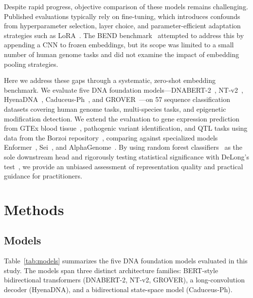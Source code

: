 \documentclass[11pt]{article}
\begin{document}
Despite rapid progress, objective comparison of these models remains challenging.  Published evaluations typically rely on fine-tuning, which introduces confounds from hyperparameter selection, layer choice, and parameter-efficient adaptation strategies such as LoRA~\citep{hu2022lora,houlsby2019parameter}.  The BEND benchmark~\citep{linder2022bend} attempted to address this by appending a CNN to frozen embeddings, but its scope was limited to a small number of human genome tasks and did not examine the impact of embedding pooling strategies.

Here we address these gaps through a systematic, zero-shot embedding benchmark.  We evaluate five DNA foundation models---DNABERT-2~\citep{zhou2023dnabert2}, NT-v2~\citep{dalla2023nucleotide}, HyenaDNA~\citep{nguyen2024hyenadna}, Caduceus-Ph~\citep{schiff2024caduceus}, and GROVER~\citep{sanabria2024grover}---on 57 sequence classification datasets covering human genome tasks, multi-species tasks, and epigenetic modification detection.  We extend the evaluation to gene expression prediction from GTEx blood tissue~\citep{gtex2020gtex,lonsdale2013genotype}, pathogenic variant identification, and QTL tasks using data from the Borzoi repository~\citep{liao2024borzoi}, comparing against specialized models Enformer~\citep{avsec2021enformer}, Sei~\citep{chen2022sei}, and AlphaGenome~\citep{cheng2025alphagenome}.  By using random forest classifiers~\citep{breiman2001random} as the sole downstream head and rigorously testing statistical significance with DeLong's test~\citep{delong1988comparing}, we provide an unbiased assessment of representation quality and practical guidance for practitioners.

\section{Methods}

\subsection{Models}

Table~\ref{tab:models} summarizes the five DNA foundation models evaluated in this study.  The models span three distinct architecture families: BERT-style bidirectional transformers (DNABERT-2, NT-v2, GROVER), a long-convolution decoder (HyenaDNA), and a bidirectional state-space model (Caduceus-Ph).
\end{document}
